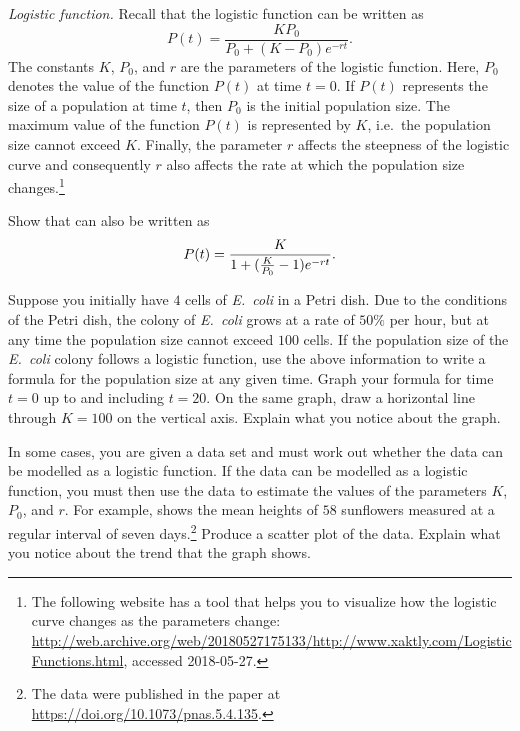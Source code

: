 \documentclass[a4paper,oneside,12pt]{article}
\begin{document}
\begin{problem}
\item\emph{Logistic function.}
  Recall that the logistic function can be written as
  \begin{equation}
  \label{eqn:logarithm:logistic_function}
  P(t)
  =
  \frac{
    KP_0
  }{
    P_0 + (K - P_0) e^{-rt}
  }.
  \end{equation}
  The constants $K$, $P_0$, and $r$ are the parameters of the logistic
  function.  Here, $P_0$ denotes the value of the function $P(t)$ at
  time $t = 0$.  If $P(t)$ represents the size of a population at time
  $t$, then $P_0$ is the initial population size.  The maximum value
  of the function $P(t)$ is represented by $K$, i.e.~the population
  size cannot exceed $K$.  Finally, the parameter $r$ affects the
  steepness of the logistic curve and consequently $r$ also affects
  the rate at which the population size changes.\footnote{
    The following website has a tool that helps you to visualize how
    the logistic curve changes as the parameters change:
    \url{http://web.archive.org/web/20180527175133/http://www.xaktly.com/LogisticFunctions.html},
    accessed 2018-05-27.
  }
  \begin{packedenum}
  \item\label{subprob:logarithm:logistic_equivalent_form}
    Show that  can also be
    written as
    \begin{equation}
    \label{eqn:logarithm:logistic_equivalent_form}
    P(t)
    =
    \frac{
      K
    }{
      1 + \lparen\frac{K}{P_0} - 1\rparen e^{-rt}
    }.
    \end{equation}

  \item\label{subprob:logarithm:logistic_Ecoli_example}
    Suppose you initially have $4$ cells of \emph{E.~coli} in a Petri
    dish.  Due to the conditions of the Petri dish, the colony of
    \emph{E.~coli} grows at a rate of $50\%$ per hour, but at any time
    the population size cannot exceed $100$ cells.  If the population
    size of the \emph{E.~coli} colony follows a logistic function, use
    the above information to write a formula for the population size
    at any given time.  Graph your formula for time $t = 0$ up to and
    including $t = 20$.  On the same graph, draw a horizontal line
    through $K = 100$ on the vertical axis.  Explain what you notice
    about the graph.

  \item\label{subprob:logarithm:logistic_sunflower_data}
    In some cases, you are given a data set and must work out whether
    the data can be modelled as a logistic function.  If the data can
    be modelled as a logistic function, you must then use the data to
    estimate the values of the parameters $K$, $P_0$, and $r$.  For
    example,  shows the mean heights of
    $58$ sunflowers measured at a regular interval of seven
    days.\footnote{
      The data were published in the paper at
      \url{https://doi.org/10.1073/pnas.5.4.135}.
    }
    Produce a scatter plot of the data.  Explain what you notice about
    the trend that the graph shows.


\end{packedenum}
\end{problem}
\end{document}
